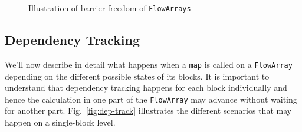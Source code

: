 \documentclass[runningheads,a4paper,fleqn]{llncs}
\begin{document}
\begin{figure}
  \caption{Illustration of barrier-freedom of \texttt{FlowArrays}}
  \label{fig:barrier-free}
\end{figure}

\subsection{Dependency Tracking}
We'll now describe in detail what happens when a \texttt{map} is
called on a \texttt{FlowArray} depending on the different possible states of
its blocks.  It is important to understand that dependency tracking
happens for each block individually and hence the calculation in one
part of the \texttt{FlowArray} may advance without waiting for another
part. Fig.~\ref{fig:dep-track} illustrates the different scenarios that
may happen on a single-block level.
\end{document}
